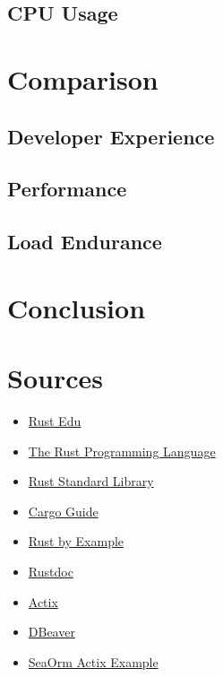 \documentclass[a4paper,12pt]{article}
\begin{document}
	\subsection*{CPU Usage}

	\section{Comparison}
	\label{sec:comparison}


	\subsection{Developer Experience}
	\label{subsec:developer_experience}
	
	\subsection{Performance}
	\label{subsec:performance}

	\subsection{Load Endurance}
	\label{subsec:load_endurance}

	\section{Conclusion}
	\label{subsec:conclusion}
	
	\newpage
	\section{Sources}
	\label{sec:Sources}
	\begin{itemize}
		\item \href{https://rust-edu.org/resources/}{Rust Edu}
		\item \href{https://doc.rust-lang.org/book/}{The Rust Programming Language}
		\item \href{https://doc.rust-lang.org/std/}{Rust Standard Library}
		\item \href{https://doc.rust-lang.org/cargo/}{Cargo Guide}
		\item \href{https://doc.rust-lang.org/rust-by-example/}{Rust by Example}
		\item \href{https://doc.rust-lang.org/rustdoc/}{Rustdoc}
		\item \href{https://actix.rs/}{Actix}
		\item \href{https://dbeaver.io/}{DBeaver}
		\item \href{https://github.com/SeaQL/SeaOrm/tree/master/examples/actix_example}{SeaOrm Actix Example}
	\end{itemize}
	\printbibliography[title={Whole bibliography}]
\end{document}
